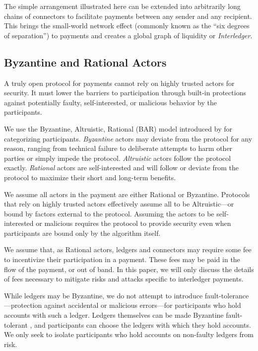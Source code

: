 \documentclass[letterpaper,twocolumn,10pt]{article}
\begin{document}
The simple arrangement illustrated here can be extended into arbitrarily long chains of connectors to facilitate payments between any sender and any recipient. This brings the small-world network effect (commonly known as the ``six degrees of separation'') \cite{albert1999internet,watts1998collective} to payments and creates a global graph of liquidity or \mbox{\textit{Interledger}}.

\subsection{Byzantine and Rational Actors}

A truly open protocol for payments cannot rely on highly trusted actors for security. It must lower the barriers to participation through built-in protections against potentially faulty, self-interested, or malicious behavior by the participants.

We use the Byzantine, Altruistic, Rational (BAR) model introduced by \cite{aiyer2005bar} for categorizing participants. \textit{Byzantine} actors may deviate from the protocol for any reason, ranging from technical failure to deliberate attempts to harm other parties or simply impede the protocol. \textit{Altruistic} actors follow the protocol exactly. \textit{Rational} actors are self-interested and will follow or deviate from the protocol to maximize their short and long-term benefits.

We assume all actors in the payment are either Rational or Byzantine. Protocols that rely on highly trusted actors effectively assume all to be Altruistic---or bound by factors external to the protocol. Assuming the actors to be self-interested or malicious requires the protocol to provide security even when participants are bound only by the algorithm itself.

We assume that, as Rational actors, ledgers and connectors may require some fee to incentivize their participation in a payment. These fees may be paid in the flow of the payment, or out of band. In this paper, we will only discuss the details of fees necessary to mitigate risks and attacks specific to interledger payments.

While ledgers may be Byzantine, we do not attempt to introduce fault-tolerance---protection against accidental or malicious errors---for participants who hold accounts with such a ledger. Ledgers themselves can be made Byzantine fault-tolerant \cite{mazieresstellar,Bitcoin,schwartz2014ripple}, and participants can choose the ledgers with which they hold accounts. We only seek to isolate participants who hold accounts on non-faulty ledgers from risk.
\end{document}
